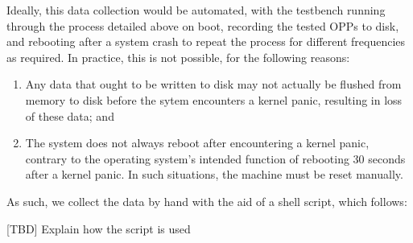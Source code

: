 Ideally, this data collection would be automated, with the testbench running
through the process detailed above on boot, recording the tested OPPs to disk,
and rebooting after a system crash to repeat the process for different
frequencies as required. In practice, this is not possible, for the following
reasons:
\begin{enumerate}
    \item Any data that ought to be written to disk may not actually be flushed
        from memory to disk before the sytem encounters a kernel panic, 
        resulting in loss of these data; and
    \item The system does not always reboot after encountering a kernel panic,
        contrary to the operating system's intended function of rebooting 30
        seconds after a kernel panic. In such situations, the machine must be
        reset manually.
\end{enumerate}

As such, we collect the data by hand with the aid of a shell script, which
follows:



[TBD] Explain how the script is used
